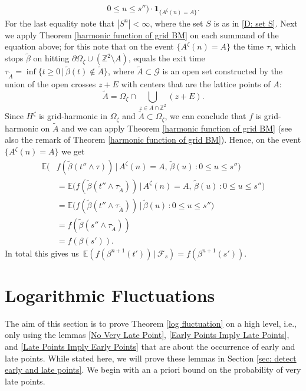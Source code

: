 \documentclass[11pt]{article}
\makeatletter
\renewenvironment{proof}[1][\proofname]{
   \par\pushQED{\qed}\normalfont
   \topsep6\p@\@plus6\p@\relax
   \trivlist\item[\hskip\labelsep\bfseries#1\@addpunct{.}]
   \ignorespaces
}{
   \popQED\endtrivlist\@endpefalse
}
\numberwithin{equation}{section}
\def\OZ{\Omega_{\zeta}}
\def\AZN{A^{\zeta}(n)}
\def\Ex{\mathbb{E}}
\def\FS{\mathcal{F}_s}
\makeatother
\begin{document}
\begin{proof}[Proof of Lemma \ref{lemma M : martingale}]
\begin{equation}
\begin{split}
              0 \leq u \leq s''\big) \cdot \boldsymbol{1}_{\{\AZN = A\}}.
    \end{split}
  \end{equation}
  For the last equality note that $|S^n| < \infty$, where the set $S$ is as in \eqref{D: set S}. 
  Next we apply Theorem \ref{harmonic function of grid BM} 
  on each summand of the equation above; 
  for this note that on the event 
  $\{ \AZN = A\}$ the time $\tau$, which stops $\tilde{\beta}$ on hitting 
  $\partial \OZ \cup (\mathbb{Z}^2 \setminus A)$, equals the exit time 
  $\tau_{\tilde{A}} = \inf \{t \geq 0 \,|\,
    \tilde{\beta}(t) \notin \tilde{A} \}$,
  where $\tilde{A} \subset \mathcal{G}$ is an 
  open set constructed by the union of the open crosses $z+E$ with
  centers that are the lattice points of $A$: 
  \begin{equation}\nonumber
    \tilde{A} = 
    \OZ \cap \bigcup_{z \in A \cap \mathbb{Z}^2} 
      (z + E).
  \end{equation}
  Since $H^{\zeta}$ is grid-harmonic in 
  $\OZ$ and $\tilde{A} \subset \OZ$,
  we can conclude that
  $f$ is grid-harmonic on $\tilde{A}$ and we can apply 
  Theorem \ref{harmonic function of grid BM}
  (see also the remark of Theorem 
  \ref{harmonic function of grid BM}). 
  Hence, on the event $\{\AZN = A \}$ we get
  \begin{equation}
    \nonumber
    \begin{split}
      \Ex \big( & f(\tilde{\beta}(t'' \land \tau) )  
          \, \big|\, \AZN = A,\, \tilde{\beta}(u) \,:
            0 \leq u \leq s'' \big)\\
      & = 
        \Ex \big( f(\tilde{\beta}(t'' \land \tau_{\tilde{A}}) )  
      \,\big|\, \AZN = A,\, \tilde{\beta}(u) \,:
      0 \leq u \leq s'' \big)\\
      & = 
        \Ex \big( f(\tilde{\beta}(t'' \land \tau_{\tilde{A}}) )  
        \,\big|\, \tilde{\beta}(u) \,:
        0 \leq u \leq s'' \big) \\
      & = 
      f(\tilde{\beta}(s'' \land \tau_{\tilde{A}}))\\
      & = f(\beta(s')).
    \end{split}
  \end{equation}
  In total this gives us
  $\, \Ex( f(\beta^{n+1}(t')) \,|\, \FS) = f(\beta^{n+1}(s'))$.
\end{proof}


\section{Logarithmic Fluctuations} 
\label{Sec: Proof Lof Fluctuation}
The aim of this section is to prove Theorem 
\ref{log fluctuation} on a high level, i.e., only using the 
lemmas \ref{No Very Late Point}, \ref{Early Points Imply Late Points}, 
and \ref{Late Points Imply Early Points}
that are about the occurrence of early and late points.
While stated here, we will prove these lemmas 
in Section \ref{sec: detect early and late points}.
We begin with an a priori bound on the probability of very late points.
\end{document}
